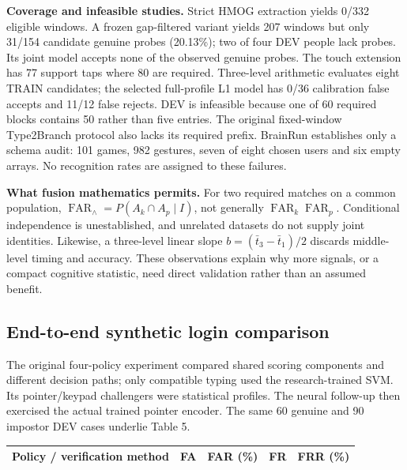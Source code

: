 \documentclass[10pt,a4paper]{article}
\begin{document}
\textbf{Coverage and infeasible studies.} Strict HMOG extraction yields 0/332 eligible windows. A frozen gap-filtered variant yields 207 windows but only 31/154 candidate genuine probes (20.13\%); two of four DEV people lack probes. Its joint model accepts none of the observed genuine probes. The touch extension has 77 support taps where 80 are required. Three-level arithmetic evaluates eight TRAIN candidates; the selected full-profile L1 model has 0/36 calibration false accepts and 11/12 false rejects. DEV is infeasible because one of 60 required blocks contains 50 rather than five entries. The original fixed-window Type2Branch protocol also lacks its required prefix. BrainRun establishes only a schema audit: 101 games, 982 gestures, seven of eight chosen users and six empty arrays. No recognition rates are assigned to these failures.

\textbf{What fusion mathematics permits.} For two required matches on a common population,
$\operatorname{FAR}_{\wedge}=P(A_k\cap A_p\mid I)$, not generally $\operatorname{FAR}_k\operatorname{FAR}_p$.
Conditional independence is unestablished, and unrelated datasets do not supply joint identities. Likewise, a three-level linear slope $b=(\bar t_3-\bar t_1)/2$ discards middle-level timing and accuracy. These observations explain why more signals, or a compact cognitive statistic, need direct validation rather than an assumed benefit.

\newpage
\subsection{End-to-end synthetic login comparison}
The original four-policy experiment compared shared scoring components and different decision paths; only compatible typing used the research-trained SVM. Its pointer/keypad challengers were statistical profiles. The neural follow-up then exercised the actual trained pointer encoder. The same 60 genuine and 90 impostor DEV cases underlie Table 5.
\begin{center}\small
\begin{tabularx}{\linewidth}{@{}Xrrrr@{}}
\toprule
\textbf{Policy / verification method} & \textbf{FA} & \textbf{FAR (\%)} & \textbf{FR} & \textbf{FRR (\%)}\\\midrule

\end{tabularx}
\end{center}
\end{document}
